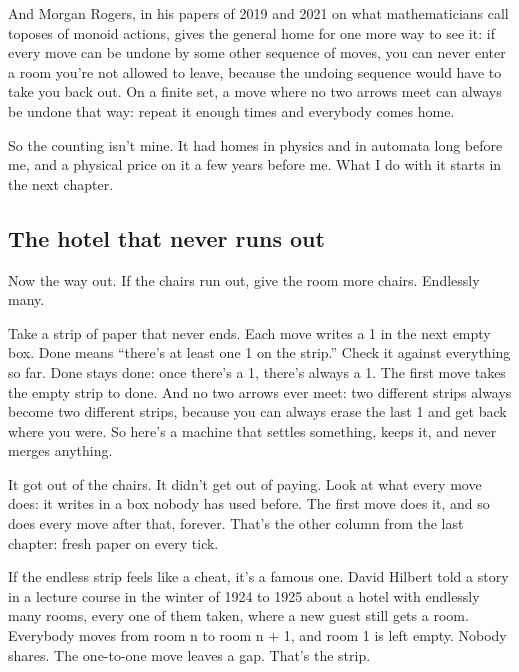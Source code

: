 \documentclass[11pt,twoside]{article}
\theoremstyle{thielethm}
\theoremstyle{thieledef}
\theoremstyle{thieledef}
\theoremstyle{thieledef}
\theoremstyle{thielethm}
\theoremstyle{thieleobs}
\theoremstyle{thielethm}
\begin{document}
And Morgan Rogers, in his papers of 2019 and 2021 on what mathematicians call toposes of monoid actions, gives the general home for one more way to see it: if every move can be undone by some other sequence of moves, you can never enter a room you're not allowed to leave, because the undoing sequence would have to take you back out. On a finite set, a move where no two arrows meet can always be undone that way: repeat it enough times and everybody comes home.

So the counting isn't mine. It had homes in physics and in automata long before me, and a physical price on it a few years before me. What I do with it starts in the next chapter.

\subsection{The hotel that never runs out}

Now the way out. If the chairs run out, give the room more chairs. Endlessly many.

Take a strip of paper that never ends. Each move writes a 1 in the next empty box. Done means ``there's at least one 1 on the strip.'' Check it against everything so far. Done stays done: once there's a 1, there's always a 1. The first move takes the empty strip to done. And no two arrows ever meet: two different strips always become two different strips, because you can always erase the last 1 and get back where you were. So here's a machine that settles something, keeps it, and never merges anything.

It got out of the chairs. It didn't get out of paying. Look at what every move does: it writes in a box nobody has used before. The first move does it, and so does every move after that, forever. That's the other column from the last chapter: fresh paper on every tick.

If the endless strip feels like a cheat, it's a famous one. David Hilbert told a story in a lecture course in the winter of 1924 to 1925 about a hotel with endlessly many rooms, every one of them taken, where a new guest still gets a room. Everybody moves from room n to room n + 1, and room 1 is left empty. Nobody shares. The one-to-one move leaves a gap. That's the strip.
\end{document}
